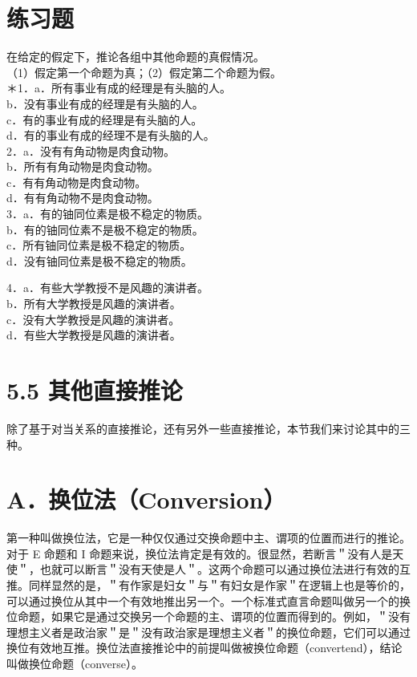 \section*{练习题}
在给定的假定下，推论各组中其他命题的真假情况。\\
（1）假定第一个命题为真；（2）假定第二个命题为假。\\
＊1．a．所有事业有成的经理是有头脑的人。\\
b．没有事业有成的经理是有头脑的人。\\
c．有的事业有成的经理是有头脑的人。\\
d．有的事业有成的经理不是有头脑的人。\\
2．a．没有有角动物是肉食动物。\\
b．所有有角动物是肉食动物。\\
c．有有角动物是肉食动物。\\
d．有有角动物不是肉食动物。\\
3．a．有的铀同位素是极不稳定的物质。\\
b．有的铀同位素不是极不稳定的物质。\\
c．所有铀同位素是极不稳定的物质。\\
d．没有铀同位素是极不稳定的物质。

4．a．有些大学教授不是风趣的演讲者。\\
b．所有大学教授是风趣的演讲者。\\
c．没有大学教授是风趣的演讲者。\\
d．有些大学教授是风趣的演讲者。

\section*{5.5 其他直接推论}
除了基于对当关系的直接推论，还有另外一些直接推论，本节我们来讨论其中的三种。

\section*{A．换位法（Conversion）}
第一种叫做换位法，它是一种仅仅通过交换命题中主、谓项的位置而进行的推论。对于 E 命题和 I 命题来说，换位法肯定是有效的。很显然，若断言＂没有人是天使＂，也就可以断言＂没有天使是人＂。这两个命题可以通过换位法进行有效的互推。同样显然的是，＂有作家是妇女＂与＂有妇女是作家＂在逻辑上也是等价的，可以通过换位从其中一个有效地推出另一个。一个标准式直言命题叫做另一个的换位命题，如果它是通过交换另一个命题的主、谓项的位置而得到的。例如，＂没有理想主义者是政治家＂是＂没有政治家是理想主义者＂的换位命题，它们可以通过换位有效地互推。换位法直接推论中的前提叫做被换位命题（convertend），结论叫做换位命题（converse）。

